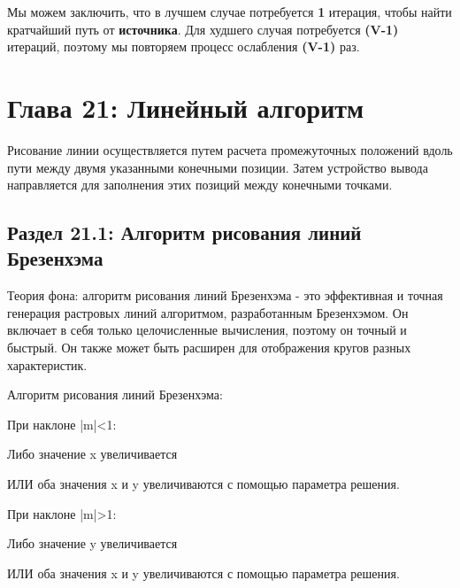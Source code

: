 Мы можем заключить, что в лучшем случае потребуется \textbf{1} итерация, чтобы найти
кратчайший путь от \textbf{источника}. Для худшего случая потребуется \textbf{(V-1)} итераций, поэтому мы
повторяем процесс ослабления \textbf{(V-1)} раз.

\chapter*{Глава 21: Линейный алгоритм}
\vspace{-1cm}
Рисование линии осуществляется путем расчета промежуточных положений вдоль пути
между двумя указанными конечными позиции. Затем устройство вывода направляется для
заполнения этих позиций между конечными точками.

\section*{Раздел 21.1: Алгоритм рисования линий Брезенхэма}

Теория фона: алгоритм рисования линий Брезенхэма - это эффективная и точная генерация
растровых линий алгоритмом, разработанным Брезенхэмом. Он включает в себя только
целочисленные вычисления, поэтому он точный и быстрый. Он также может быть расширен
для отображения кругов разных характеристик.

Алгоритм рисования линий Брезенхэма:

При наклоне |m|<1:

Либо значение x увеличивается

ИЛИ оба значения x и y увеличиваются с помощью параметра решения.

При наклоне |m|>1:

Либо значение y увеличивается

ИЛИ оба значения x и y увеличиваются с помощью параметра решения.

